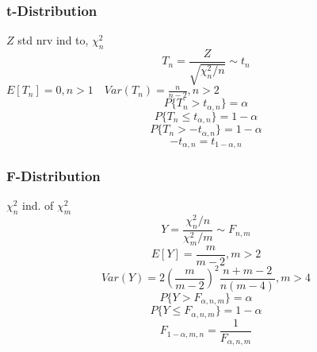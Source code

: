 \subsubsection{t-Distribution}
$Z$ std nrv ind to, $\chi_n^2$
$$T_n = \frac{Z}{\sqrt{\chi_n^2/n}} \sim t_n$$
$E[T_n] = 0, n>1 \quad Var(T_n) = \frac{n}{n-2}, n>2$
$$P\{T_n > t_{\alpha,n}\} = \alpha$$
$$P\{T_n \leq t_{\alpha,n}\} = 1- \alpha$$
$$P\{T_n > -t_{\alpha,n}\} = 1- \alpha$$
$$-t_{\alpha, n} = t_{1-\alpha, n}$$
\subsubsection{F-Distribution}
$\chi_n^2$ ind. of $\chi_m^2$
$$Y=\frac{\chi_n^2/n}{\chi_m^2/m} \sim F_{n,m}$$
$$E[Y] = \frac{m}{m-2}, m>2$$
$$Var(Y) = 2 \left(\frac{m}{m-2}\right)^2\frac{n+m-2}{n(m-4)}, m>4$$
$$P\{Y > F_{\alpha,n,m}\} = \alpha$$
$$P\{Y \leq F_{\alpha,n,m}\} = 1-\alpha$$
$$F_{1-\alpha,m,n} = \frac{1}{F_{\alpha,n,m}}$$
